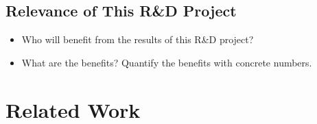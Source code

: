 \documentclass[thesis]{mas_proposal}
\begin{document}
\subsection{Relevance of This R\&D Project}
\begin{itemize}

      \item Who will benefit from the results of this R\&D project?
      \item What are the benefits? Quantify the benefits with concrete numbers.
\end{itemize}

\section{Related Work}
\end{document}
